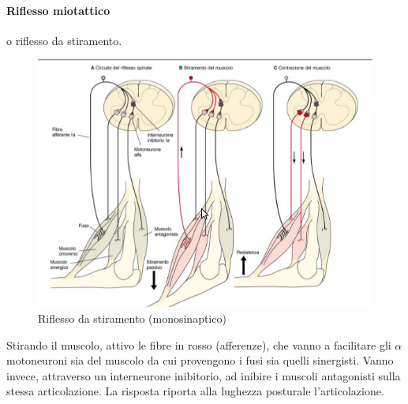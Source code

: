 \documentclass[a4paper,12pt]{article}
\begin{document}
\paragraph{Riflesso miotattico}
o riflesso da stiramento. 
\begin{figure}[H]
\centering
\includegraphics[scale=0.35]{immagine/stiramento.jpg}
\caption{Riflesso da stiramento (monosinaptico)}
\end{figure}
Stirando il muscolo, attivo le fibre in rosso (afferenze), che vanno a facilitare gli $\alpha$ motoneuroni sia del muscolo da cui provengono i fusi sia quelli sinergisti. Vanno invece, attraverso un interneurone inibitorio, ad inibire i muscoli antagonisti sulla stessa articolazione. La risposta riporta alla lughezza posturale l'articolazione.
\end{document}
